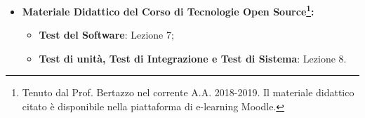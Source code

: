\begin{itemize}
		\item \textbf{Materiale Didattico del Corso di Tecnologie Open Source\footnote{Tenuto dal Prof. Bertazzo nel corrente A.A. 2018-2019. Il materiale didattico citato è disponibile nella piattaforma di e-learning Moodle.}:}
			\begin{itemize}
				\item \textbf{Test del Software}: Lezione 7;
				\item \textbf{Test di unità, Test di Integrazione e Test di Sistema}: Lezione 8.
			\end{itemize}
	\end{itemize}